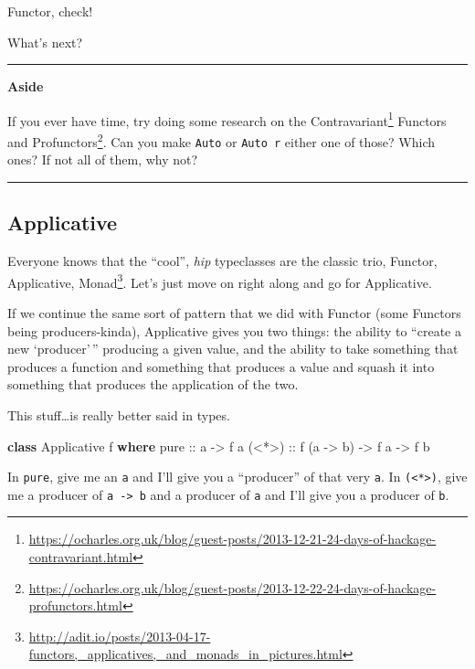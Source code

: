\documentclass[]{article}
\newenvironment{Shaded}{}{}
\newcommand{\KeywordTok}[1]{\textcolor[rgb]{0.00,0.44,0.13}{\textbf{{#1}}}}
\newcommand{\DataTypeTok}[1]{\textcolor[rgb]{0.56,0.13,0.00}{{#1}}}
\newcommand{\OtherTok}[1]{\textcolor[rgb]{0.00,0.44,0.13}{{#1}}}
\newcommand{\NormalTok}[1]{{#1}}
\renewcommand{\href}[2]{#2\footnote{\url{#1}}}
\begin{document}
Functor, check!

What's next?

\begin{center}\rule{0.5\linewidth}{\linethickness}\end{center}

\textbf{Aside}

If you ever have time, try doing some research on the
\href{https://ocharles.org.uk/blog/guest-posts/2013-12-21-24-days-of-hackage-contravariant.html}{Contravariant}
Functors and
\href{https://ocharles.org.uk/blog/guest-posts/2013-12-22-24-days-of-hackage-profunctors.html}{Profunctors}.
Can you make \texttt{Auto} or \texttt{Auto\ r} either one of those? Which ones?
If not all of them, why not?

\begin{center}\rule{0.5\linewidth}{\linethickness}\end{center}

\subsection{Applicative}\label{applicative}

Everyone knows that the ``cool'', \emph{hip} typeclasses are the classic trio,
\href{http://adit.io/posts/2013-04-17-functors,_applicatives,_and_monads_in_pictures.html}{Functor,
Applicative, Monad}. Let's just move on right along and go for Applicative.

If we continue the same sort of pattern that we did with Functor (some Functors
being producers-kinda), Applicative gives you two things: the ability to
``create a new `producer'\,'' producing a given value, and the ability to take
something that produces a function and something that produces a value and
squash it into something that produces the application of the two.

This stuff\ldots{}is really better said in types.

\begin{Shaded}
\begin{Highlighting}[]
\KeywordTok{class} \DataTypeTok{Applicative} \NormalTok{f }\KeywordTok{where}
\OtherTok{    pure  ::} \NormalTok{a }\OtherTok{->} \NormalTok{f a}
\OtherTok{    (<*>) ::} \NormalTok{f (a }\OtherTok{->} \NormalTok{b) }\OtherTok{->} \NormalTok{f a }\OtherTok{->} \NormalTok{f b}
\end{Highlighting}
\end{Shaded}

In \texttt{pure}, give me an \texttt{a} and I'll give you a ``producer'' of that
very \texttt{a}. In \texttt{(\textless{}*\textgreater{})}, give me a producer of
\texttt{a\ -\textgreater{}\ b} and a producer of \texttt{a} and I'll give you a
producer of \texttt{b}.
\end{document}
